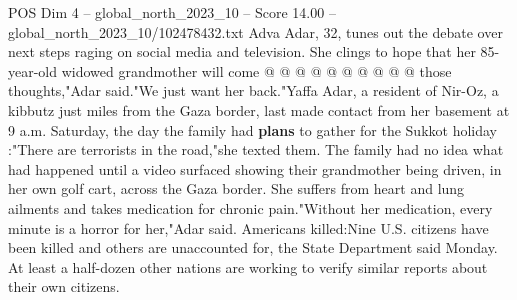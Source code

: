 \begin{textsample}{POS Dim 4 – global\_north\_2023\_10 – Score 14.00 – global\_north\_2023\_10/102478432.txt}
Adva Adar, 32, tunes out the debate over next steps raging on social media and television.
She clings to hope that her 85-year-old widowed grandmother will come @ @ @ @ @ @ @ @ @ @ those thoughts,"Adar said."We just want her back."Yaffa Adar, a resident of Nir-Oz, a kibbutz just miles from the Gaza border, last made contact from her basement at 9 a.m.
Saturday, the day the family had \textbf{plans} to gather for the Sukkot holiday :"There are terrorists in the road,"she texted them.
The family had no idea what had happened until a video surfaced showing their grandmother being driven, in her own golf cart, across the Gaza border.
She suffers from heart and lung ailments and takes medication for chronic pain."Without her medication, every minute is a horror for her,"Adar said.
Americans killed:Nine U.S. citizens have been killed and others are unaccounted for, the State Department said Monday.
At least a half-dozen other nations are working to verify similar reports about their own citizens.

\end{textsample}
